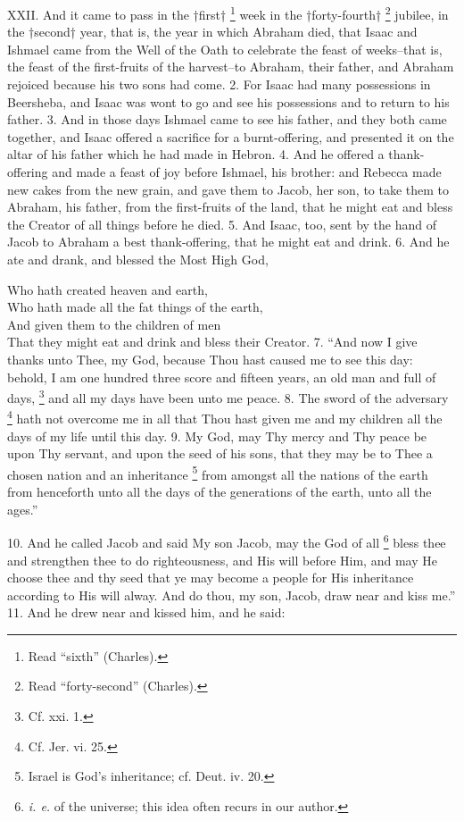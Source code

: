 XXII. And it came to pass in the †first† \footnote{Read ``sixth'' (Charles).} week in the †forty-fourth† \footnote{Read ``forty-second'' (Charles).} jubilee, in the †second† year, that is, the year in which Abraham died, that Isaac and Ishmael came from the Well of the Oath to celebrate the feast of weeks--that is, the feast of the first-fruits of the harvest--to Abraham, their father, and Abraham rejoiced because his two sons had come. 2. For Isaac had many possessions in Beersheba, and Isaac was wont to go and see his possessions and to return to his father. 3. And in those days Ishmael came to see his father, and they both came together, and Isaac offered a sacrifice for a burnt-offering, and presented it on the altar of his father which he had made in Hebron. 4. And he offered a thank-offering and made a feast of joy before Ishmael, his brother: and Rebecca made new cakes from the new grain, and gave them to Jacob, her son, to take them to Abraham, his father, from the first-fruits of the land, that he might eat and bless the Creator of all things before he died. 5. And Isaac, too, sent by the hand of Jacob to Abraham a best thank-offering, that he might eat and drink. 6. And he ate and drank, and blessed the Most High God,

Who hath created heaven and earth,\\
Who hath made all the fat things of the earth,\\
And given them to the children of men\\
That they might eat and drink and bless their Creator. 7. ``And now I give thanks unto Thee, my God, because Thou hast caused me to see this day: behold, I am one hundred three score and fifteen years, an old man and full of days, \footnote{Cf. xxi. 1.} and all my days have been unto me peace. 8. The sword of the adversary \footnote{Cf. Jer. vi. 25.} hath not overcome me in all that Thou hast given me and my children all the days of my life until this day. 9. My God, may Thy mercy and Thy peace be upon Thy servant, and upon the seed of his sons, that they may be to Thee a chosen nation and an inheritance \footnote{Israel is God's inheritance; cf. Deut. iv. 20.} from amongst all the nations of the earth from henceforth unto all the days of the generations of the earth, unto all the ages.''


10. And he called Jacob and said My son Jacob, may the God of all \footnote{\emph{i. e.} of the universe; this idea often recurs in our author.} bless thee and strengthen thee to do righteousness, and His will before Him, and may He choose thee and thy seed that ye may become a people for His inheritance according to His will alway. And do thou, my son, Jacob, draw near and kiss me.'' 11. And he drew near and kissed him, and he said:

